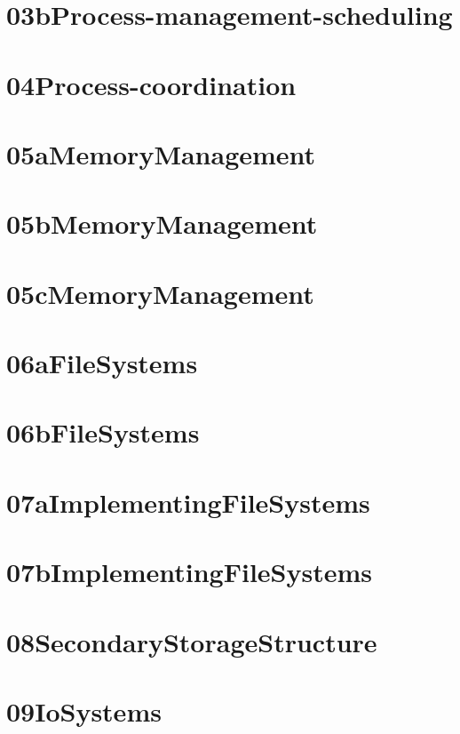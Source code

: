 \documentclass[a4paper]{scrreprt}
\begin{document}
\chapter{03bProcess-management-scheduling}
\chapter{04Process-coordination}
\chapter{05aMemoryManagement}
\chapter{05bMemoryManagement}
\chapter{05cMemoryManagement}
\chapter{06aFileSystems}
\chapter{06bFileSystems}
\chapter{07aImplementingFileSystems}
\chapter{07bImplementingFileSystems}
\chapter{08SecondaryStorageStructure}
\chapter{09IoSystems}
\end{document}
